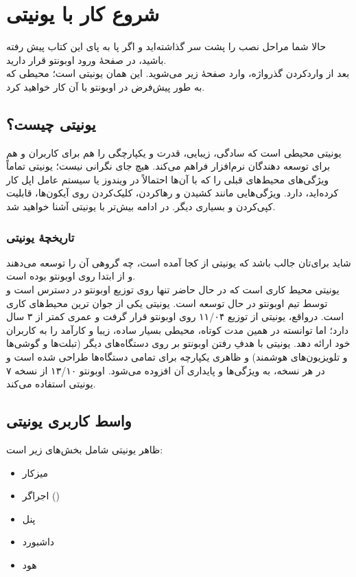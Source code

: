 \chapter{شروع کار با یونیتی}
حالا شما مراحل نصب را پشت سر گذاشته‌اید و اگر پا به پای این کتاب پیش رفته باشید، در صفحهٔ ورود اوبونتو قرار دارید.\\
بعد از واردکردن گذرواژه، وارد صفحهٔ زیر می‌شوید. این همان یونیتی است؛ محیطی که به طور پیش‌فرض در اوبونتو با آن کار خواهید کرد.\\

\section{یونیتی چیست؟}
یونیتی محیطی است که سادگی، زیبایی، قدرت و یکپارچگی را هم برای کاربران و هم برای توسعه دهندگان نرم‌افزار فراهم می‌کند.
هیچ جای نگرانی نیست؛ یونیتی تماماً ویژگی‌های محیط‌های قبلی را که با آن‌ها احتمالاً در ویندوز یا سیستم عامل اپل کار کرده‌اید، دارد. ویژگی‌هایی مانند کشیدن و رهاکردن، کلیک‌کردن روی آیکون‌ها، قابلیت کپی‌کردن و بسیاری دیگر.
در ادامه بیش‌تر با یونیتی آشنا خواهید شد.
\subsection{تاریخچهٔ یونیتی}
شاید برای‌تان جالب باشد که یونیتی از کجا آمده است، چه گروهی آن را توسعه می‌دهند و از ابتدا روی اوبونتو بوده است.\\
یونیتی محیط کاری است که در حال حاضر تنها روی توزیع اوبونتو در دسترس است و توسط تیم اوبونتو در حال توسعه است. یونیتی یکی از جوان ترین محیط‌های کاری است. در‌واقع، یونیتی از توزیع ۱۱/۰۴ روی اوبونتو قرار گرفت و عمری کمتر از ۳ سال دارد؛ اما توانسته در همین مدت کوتاه، محیطی بسیار ساده، زیبا و کارآمد را به کاربران خود ارائه دهد. یونیتی با هدفِ رفتن اوبونتو بر روی دستگاه‌های دیگر (تبلت‌ها و گوشی‌ها و تلویزیون‌های هوشمند) و ظاهری یکپارچه برای تمامی دستگاه‌ها طراحی شده است و در هر نسخه، به ویژگی‌ها و پایداری آن افزوده می‌شود. اوبونتو ۱۳/۱۰ از نسخه ۷ یونیتی استفاده می‌کند.
\section{واسط کاربری یونیتی}
ظاهر یونیتی شامل بخش‌های زیر است:
\begin{itemize}
\item میزکار
\item اجراگر ()
\item پنل
\item داشبورد
\item هود
\end{itemize}

